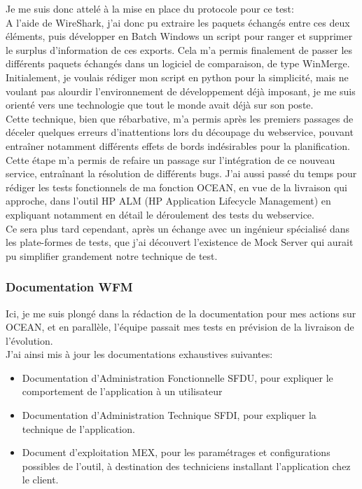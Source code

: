 \documentclass{rapport}
\begin{document}
Je me suis donc attelé à la mise en place du protocole pour ce test:\\
A l'aide de WireShark, j'ai donc pu extraire les paquets échangés entre ces deux éléments, puis développer en Batch Windows un script pour ranger et supprimer le surplus d'information de ces exports. Cela m'a permis finalement de passer les différents paquets échangés dans un logiciel de comparaison, de type WinMerge.\\
Initialement, je voulais rédiger mon script en python pour la simplicité, mais ne voulant pas alourdir l'environnement de développement déjà imposant, je me suis orienté vers une technologie que tout le monde avait déjà sur son poste.\\

Cette technique, bien que rébarbative, m'a permis après les premiers passages de déceler quelques erreurs d'inattentions lors du découpage du webservice, pouvant entraîner notamment différents effets de bords indésirables pour la planification.\\

Cette étape m'a permis de refaire un passage sur l'intégration de ce nouveau service, entraînant la résolution de différents bugs. J'ai aussi passé du temps pour rédiger les tests fonctionnels de ma fonction OCEAN, en vue de la livraison qui approche, dans l'outil HP ALM (HP Application Lifecycle Management) en expliquant notamment en détail le déroulement des tests du webservice.\\

Ce sera plus tard cependant, après un échange avec un ingénieur spécialisé dans les plate-formes de tests, que j'ai découvert l'existence de Mock Server qui aurait pu simplifier grandement notre technique de test.

\subsubsection{Documentation WFM}

Ici, je me suis plongé dans la rédaction de la documentation pour mes actions sur OCEAN, et en  parallèle, l'équipe passait mes tests en prévision de la livraison de l'évolution.\\

J'ai ainsi mis à jour les documentations exhaustives suivantes:
    \begin{itemize}
        \item Documentation d'Administration Fonctionnelle SFDU, pour expliquer le comportement de l'application à un utilisateur
        \item Documentation d'Administration Technique SFDI, pour expliquer la technique de l'application.
        \item Document d'exploitation MEX, pour les paramétrages et configurations possibles de l'outil, à destination des techniciens installant l'application chez le client.
    \end{itemize}
\end{document}
